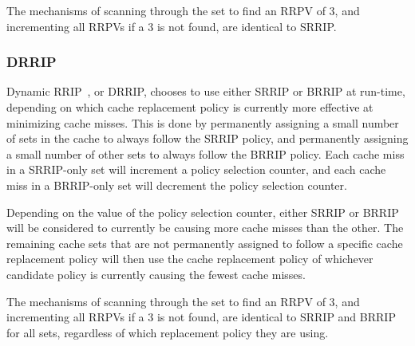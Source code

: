 The mechanisms of scanning through the set to find an RRPV of 3, and incrementing all RRPVs if a 3 is not found, are identical to SRRIP.

\subsubsection{DRRIP}

Dynamic RRIP~\cite{jaleeltheobald10}, or DRRIP, chooses to use either SRRIP or BRRIP at run-time, depending on which cache replacement policy is currently more effective at minimizing cache misses.  This is done by permanently assigning a small number of sets in the cache to always follow the SRRIP policy, and permanently assigning a small number of other sets to always follow the BRRIP policy.  Each cache miss in a SRRIP-only set will increment a policy selection counter, and each cache miss in a BRRIP-only set will decrement the policy selection counter.

Depending on the value of the policy selection counter, either SRRIP or BRRIP will be considered to currently be causing more cache misses than the other.  The remaining cache sets that are not permanently assigned to follow a specific cache replacement policy will then use the cache replacement policy of whichever candidate policy is currently causing the fewest cache misses.

The mechanisms of scanning through the set to find an RRPV of 3, and incrementing all RRPVs if a 3 is not found, are identical to SRRIP and BRRIP for all sets, regardless of which replacement policy they are using.

